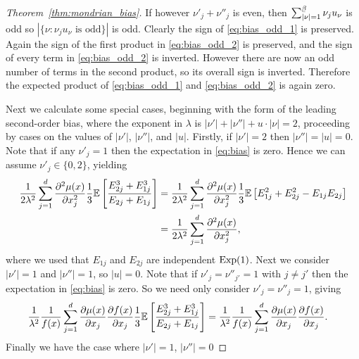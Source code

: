 \begin{proof}[Theorem~\ref{thm:mondrian_bias}]
  If however $\nu'_j + \nu''_j$ is even, then
  $\sum_{|\nu|=1}^{\flbeta} \nu_j u_\nu$ is odd so
  $|\{\nu : \nu_j u_\nu \text{ is odd}\}|$ is odd.
  Clearly the sign of \eqref{eq:bias_odd_1} is preserved.
  Again the sign of the first product in \eqref{eq:bias_odd_2}
  is preserved, and the sign of every term in \eqref{eq:bias_odd_2}
  is inverted. However there are now an odd number of terms in the
  second product, so its overall sign is inverted.
  Therefore the expected product
  of \eqref{eq:bias_odd_1} and \eqref{eq:bias_odd_2} is again zero.


  Next we calculate some special cases, beginning with
  the form of the leading second-order bias,
  where the exponent in $\lambda$ is
  $|\nu'| + |\nu''| + u \cdot |\nu| = 2$,
  proceeding by cases on the values of $|\nu'|$, $|\nu''|$, and $|u|$.
  Firstly, if $|\nu'| = 2$ then $|\nu''| = |u| = 0$.
  Note that if any $\nu'_j = 1$ then the expectation in \eqref{eq:bias} is zero.
  Hence we can assume $\nu'_j \in \{0, 2\}$, yielding
  \begin{align*}
    \frac{1}{2 \lambda^2}
    \sum_{j=1}^d
    \frac{\partial^2 \mu(x)}{\partial x_j^2}
    \frac{1}{3}
    \mathbb{E} \left[
      \frac{E_{2j}^{3} + E_{1j}^{3}} {E_{2j} + E_{1j}}
    \right]
    &=
    \frac{1}{2 \lambda^2}
    \sum_{j=1}^d
    \frac{\partial^2 \mu(x)}{\partial x_j^2}
    \frac{1}{3}
    \mathbb{E} \left[
      E_{1j}^{2}
      + E_{2j}^{2}
      - E_{1j} E_{2j}
    \right] \\
    &=
    \frac{1}{2 \lambda^2}
    \sum_{j=1}^d
    \frac{\partial^2 \mu(x)}{\partial x_j^2},
  \end{align*}
  where we used that $E_{1j}$ and $E_{2j}$ are independent $\operatorname{Exp}(1)$.
  Next we consider $|\nu'| = 1$ and $|\nu''| = 1$, so $|u| = 0$.
  Note that if $\nu'_j = \nu''_{j'} = 1$ with $j \neq j'$ then the
  expectation in \eqref{eq:bias} is zero.
  So we need only consider $\nu'_j = \nu''_j = 1$, giving
  \begin{align*}
    \frac{1}{\lambda^2}
    \frac{1}{f(x)}
    \sum_{j=1}^{d}
    \frac{\partial \mu(x)}{\partial x_j}
    \frac{\partial f(x)}{\partial x_j}
    \frac{1}{3}
    \mathbb{E} \left[
      \frac{E_{2j}^{3} + E_{1j}^{3}}
      {E_{2j} + E_{1j}}
    \right]
    &=
    \frac{1}{\lambda^2}
    \frac{1}{f(x)}
    \sum_{j=1}^{d}
    \frac{\partial \mu(x)}{\partial x_j}
    \frac{\partial f(x)}{\partial x_j}.
  \end{align*}
  Finally we have the case where $|\nu'| = 1$, $|\nu''| = 0$

\end{proof}
